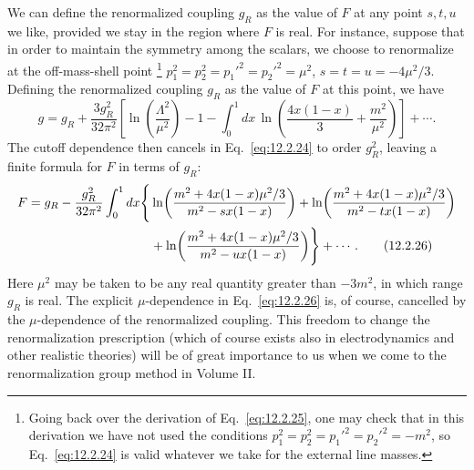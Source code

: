 We can define the renormalized coupling $g_R$ as the value of $F$ at any
point $s,t,u$ we like, provided we stay in the region where $F$ is real. For
instance, suppose that in order to maintain the symmetry among the scalars,
we choose to renormalize at the off-mass-shell point
\footnote{Going back over the derivation of Eq.~\eqref{eq:12.2.25}, one may
check that in this derivation we have not used the conditions
$p_1^2=p_2^2=p_1'^2=p_2'^2=-m^2$, so Eq.~\eqref{eq:12.2.24} is valid
whatever we take for the external line masses.}
$p_1^2=p_2^2=p_1'^2=p_2'^2=\mu^2$, $s=t=u=-4\mu^2/3$. Defining the
renormalized coupling $g_R$ as the value of $F$ at this point, we have
\begin{equation}
  g=g_R+\frac{3g_R^2}{32\pi^2}
  \left[\ln\!\left(\frac{\Lambda^2}{\mu^2}\right)-1
  -\int_0^1dx\,\ln\!\left(\frac{4x(1-x)}3+\frac{m^2}{\mu^2}\right)\right]
  +\cdots.
  \tag{12.2.25}\label{eq:12.2.25}
\end{equation}
The cutoff dependence then cancels in Eq.~\eqref{eq:12.2.24} to order
$g_R^2$, leaving a finite formula for $F$ in terms of $g_R$:
\begin{align}
 F=g_R-\frac{g_R^2}{32\pi^2}\int_0^1dx\Biggl\{
 &\ln\!\left(\frac{m^2+4x(1-x)\mu^2/3}{m^2-sx(1-x)}\right)
 +\ln\!\left(\frac{m^2+4x(1-x)\mu^2/3}{m^2-tx(1-x)}\right)
 \notag\\
 &+\ln\!\left(\frac{m^2+4x(1-x)\mu^2/3}{m^2-ux(1-x)}\right)
 \Biggr\}+\cdots.
 \tag{12.2.26}\label{eq:12.2.26}
\end{align}
Here $\mu^2$ may be taken to be any real quantity greater than $-3m^2$, in
which range $g_R$ is real. The explicit $\mu$-dependence in
Eq.~\eqref{eq:12.2.26} is, of course, cancelled by the $\mu$-dependence of
the renormalized coupling. This freedom to change the renormalization
prescription (which of course exists also in electrodynamics and other
realistic theories) will be of great importance to us when we come to the
renormalization group method in Volume II.
